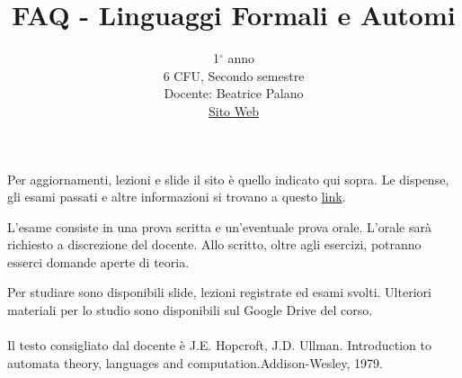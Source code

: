 \documentclass{article}
\title{FAQ - \textbf{Linguaggi Formali e Automi}}
\author{
	1$^{\circ}$ anno\\6 CFU, Secondo semestre\\
	Docente: Beatrice Palano\\ 
	\href{https://bpalanolfa.ariel.ctu.unimi.it/v5/home/Default.aspx}{Sito Web}
	\date{}
}
\begin{document}
 
	\maketitle
	
	\begin{QuestionList}
		
		 {
			Per aggiornamenti, lezioni e slide il sito è quello indicato qui sopra. Le dispense, gli esami passati e altre informazioni si trovano a questo 
			\href{https://homes.di.unimi.it/~palano/lfa/}{link}.
	    }
		
		 {
			L'esame consiste in una prova scritta e un'eventuale prova orale. L'orale sarà richiesto a discrezione del docente. Allo scritto, oltre agli esercizi, potranno esserci domande aperte di teoria.
		}
		
		 {
			Per studiare sono disponibili slide, lezioni registrate ed esami svolti. Ulteriori materiali per lo studio sono disponibili sul Google Drive del corso. \\\\
			Il testo consigliato dal docente è J.E. Hopcroft, J.D. Ullman. Introduction to automata theory, languages and computation.Addison-Wesley, 1979.
		}
		
	\end{QuestionList}
	
\end{document}
